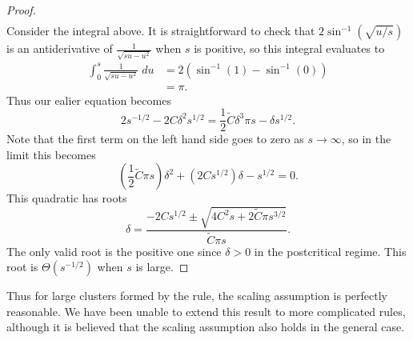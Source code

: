 \documentclass[twoside,10pt]{article}
\begin{document}
\begin{proof}
\begin{align*}
\end{align*}
	Consider the integral above. It is straightforward to check that $2\sin^{-1}(\sqrt{u/s} )$ is an antiderivative of $\frac{1}{\sqrt{su-u^2} } $ when $s$ is positive, so this integral evaluates to
	\begin{align*}
		\int_{0}^{s} \frac{1}{\sqrt{su-u^2} }\;du &= 2 \left( \sin^{-1}(1)-\sin^{-1}(0) \right) \\
							  &= \pi.
	\end{align*}
	Thus our ealier equation becomes
	\[
		2s^{-1/2} - 2C\delta^{2}s^{1/2} = \frac{1}{2} \tilde{C} \delta^{3} \pi s - \delta s^{1/2}.
	\]
        Note that the first term on the left hand side goes to zero as $s\to \infty$, so in the limit this becomes
	\[
		\left( \frac{1}{2} \tilde{C} \pi s \right)\delta^{2} + \left( 2C s^{1/2} \right)\delta - s^{1/2} =0.
	\]
	This quadratic has roots
	\[
	\delta = \frac{-2C s^{1/2} \pm \sqrt{4 C^2 s + 2 \tilde{C} \pi s^{3/2}} }{\tilde{C} \pi s}.
	\]
	The only valid root is the positive one since $\delta >0$ in the postcritical regime. This root is $\Theta(s^{-1/2})$ when $s$ is large.
\end{proof}

Thus for large clusters formed by the \ER rule, the scaling assumption is perfectly reasonable. We have been unable to extend this result to more complicated rules, although it is believed that the scaling assumption also holds in the general case.
\end{document}
